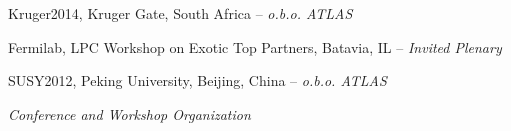 \documentclass[11pt,letterpaper]{article}
\begin{document}
\begin{itemizetighter}
  \item Kruger2014, Kruger Gate, South Africa -- \emph{o.b.o. ATLAS}  %


  \item Fermilab, LPC Workshop on Exotic Top Partners, Batavia, IL -- \emph{Invited Plenary} %

  \item SUSY2012, Peking University, Beijing, China -- \emph{o.b.o. ATLAS}  %

\end{itemizetighter}


  \emph{Conference and Workshop Organization}
\end{document}
